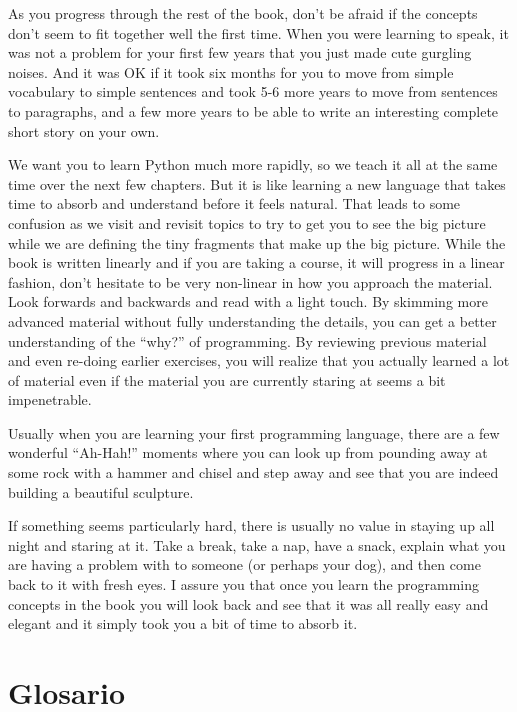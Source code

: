 As you progress through the rest of the book, don't be afraid if the concepts 
don't seem to fit together well the first time.  When you were learning to speak, 
it was not a problem  for your first few years that you just made cute gurgling noises.
And it was OK if it took six months for you to move from simple vocabulary to 
simple sentences and took 5-6 more years to move from sentences to paragraphs, and a
few more years to be able to write an interesting complete short story on your own.

We want you to learn Python much more rapidly, so we teach it all at the same time
over the next few chapters.  
But it is like learning a new language that takes time to absorb and understand
before it feels natural.
That leads to some confusion as we visit and revisit
topics to try to get you to see the big picture while we are defining the tiny
fragments that make up the big picture.  While the book is written linearly and
if you are taking a course, it will progress in a linear fashion, don't hesitate
to be very non-linear in how you approach the material.  Look forwards and backwards
and read with a light touch.  By skimming more advanced material without 
fully understanding the details, you can get a better understanding of the ``why?'' 
of programming.  By reviewing previous material and even re-doing earlier 
exercises, you will realize that you actually learned a lot of material even 
if the material you are currently staring at seems a bit impenetrable.

Usually when you are learning your first programming language, there are a few
wonderful ``Ah-Hah!'' moments where you can look up from pounding away at some rock
with a hammer and chisel and step away and see that you are indeed building 
a beautiful sculpture.

If something seems particularly hard, there is usually no value in staying up all 
night and staring at it.   Take a break, take a nap, have a snack, explain what you 
are having a problem with to someone (or perhaps your dog), and then come back to it with
fresh eyes.  I assure you that once you learn the programming concepts in the book
you will look back and see that it was all really easy and elegant and it simply 
took you a bit of time to absorb it.

\section{Glosario}


